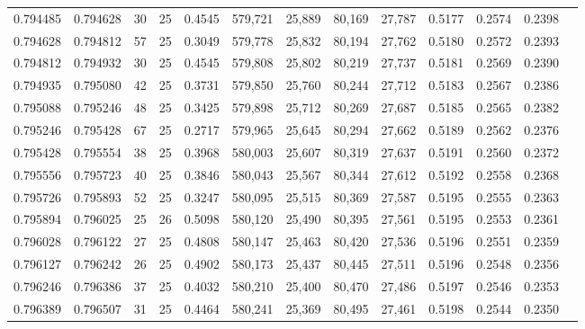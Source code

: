 \begin{tabular}{rrrrrrrrrrrrr}
0.794485 & 0.794628 &    30 &  25 &                                     0.4545 & 579,721 &  25,889 &  80,169 &  27,787 & 0.5177 & 0.2574 & 0.2398 \\
0.794628 & 0.794812 &    57 &  25 &                                     0.3049 & 579,778 &  25,832 &  80,194 &  27,762 & 0.5180 & 0.2572 & 0.2393 \\
0.794812 & 0.794932 &    30 &  25 &                                     0.4545 & 579,808 &  25,802 &  80,219 &  27,737 & 0.5181 & 0.2569 & 0.2390 \\
0.794935 & 0.795080 &    42 &  25 &                                     0.3731 & 579,850 &  25,760 &  80,244 &  27,712 & 0.5183 & 0.2567 & 0.2386 \\
0.795088 & 0.795246 &    48 &  25 &                                     0.3425 & 579,898 &  25,712 &  80,269 &  27,687 & 0.5185 & 0.2565 & 0.2382 \\
0.795246 & 0.795428 &    67 &  25 &                                     0.2717 & 579,965 &  25,645 &  80,294 &  27,662 & 0.5189 & 0.2562 & 0.2376 \\
0.795428 & 0.795554 &    38 &  25 &                                     0.3968 & 580,003 &  25,607 &  80,319 &  27,637 & 0.5191 & 0.2560 & 0.2372 \\
0.795556 & 0.795723 &    40 &  25 &                                     0.3846 & 580,043 &  25,567 &  80,344 &  27,612 & 0.5192 & 0.2558 & 0.2368 \\
0.795726 & 0.795893 &    52 &  25 &                                     0.3247 & 580,095 &  25,515 &  80,369 &  27,587 & 0.5195 & 0.2555 & 0.2363 \\
0.795894 & 0.796025 &    25 &  26 &                                     0.5098 & 580,120 &  25,490 &  80,395 &  27,561 & 0.5195 & 0.2553 & 0.2361 \\
0.796028 & 0.796122 &    27 &  25 &                                     0.4808 & 580,147 &  25,463 &  80,420 &  27,536 & 0.5196 & 0.2551 & 0.2359 \\
0.796127 & 0.796242 &    26 &  25 &                                     0.4902 & 580,173 &  25,437 &  80,445 &  27,511 & 0.5196 & 0.2548 & 0.2356 \\
0.796246 & 0.796386 &    37 &  25 &                                     0.4032 & 580,210 &  25,400 &  80,470 &  27,486 & 0.5197 & 0.2546 & 0.2353 \\
0.796389 & 0.796507 &    31 &  25 &                                     0.4464 & 580,241 &  25,369 &  80,495 &  27,461 & 0.5198 & 0.2544 & 0.2350 \\

\end{tabular}
